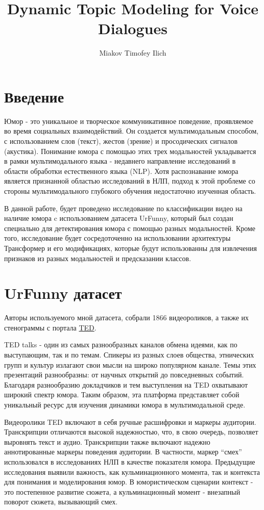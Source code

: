\documentclass[PMI,KR]{HSEUniversity}
\title{Dynamic Topic Modeling for Voice Dialogues}
\author{Miakov Timofey Ilich}
\begin{document}
\maketitle

\chapter*{Введение}

Юмор - это уникальное и творческое коммуникативное поведение, проявляемое во время социальных взаимодействий. Он создается мультимодальным способом, с использованием слов (текст), жестов (зрение) и просодических сигналов (акустика). Понимание юмора с помощью этих трех модальностей укладывается в рамки мультимодального языка - недавнего направление исследований в области обработки естественного языка (NLP).
Хотя распознавание юмора является признанной областью исследований в НЛП, подход к этой проблеме со стороны мультимодального глубокого обучения недостаточно изученная область. 

В данной работе, будет проведено исследование по классификации видео на наличие юмора c использованием датасета UrFunny\cite{urfunny:2019}, который был создан специально для детектирования юмора с помощью разных модальностей. 
Кроме того, исследование будет сосредоточенно на использовании архитектуры Трансформер и его модификациях, которые будут использованны для извлечения признаков из разных модальностей и предсказании классов. 



\chapter{UrFunny датасет}
Авторы используемого мной датасета, собрали 1866 видеороликов, а также их стенограммы с портала \href{https://www.ted.com/}{TED}.  

TED talks - один из самых разнообразных каналов обмена идеями, как по выступающим, так и по темам. Спикеры из разных слоев общества, этнических групп и культур излагают свои мысли на широко популярном канале. Темы этих презентаций разнообразны: от научных открытий до повседневных событий. Благодаря разнообразию докладчиков и тем выступления на TED охватывают широкий спектр юмора. Таким образом, эта платформа представляет собой уникальный ресурс для изучения динамики юмора в мультимодальной среде.

Видеоролики TED включают в себя ручные расшифровки и маркеры аудитории. Транскрипции отличаются высокой надежностью, что, в свою очередь, позволяет выровнять текст и аудио. Транскрипции также включают надежно аннотированные маркеры поведения аудитории. В частности, маркер “смех” использовался в исследованиях НЛП в качестве показателя юмора. Предыдущие исследования выявили важность, как кульминационного момента, так и контекста для понимания и моделирования юмор. В юмористическом сценарии контекст - это постепенное развитие сюжета, а кульминационный момент - внезапный поворот сюжета, вызывающий смех. 
\end{document}

